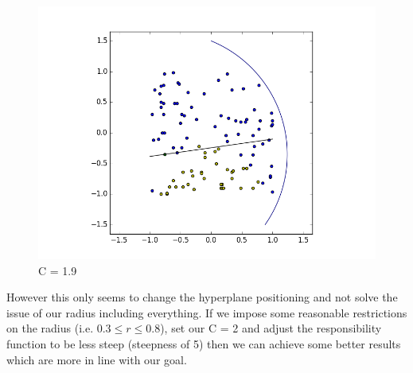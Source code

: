 \documentclass[notitlepage]{report}
\theoremstyle{definition}
\begin{document}
\begin{figure}[H]
\begin{minipage}[b]{0.49\textwidth}
    \includegraphics[width=\textwidth]{BoundaryHunter-Attempt3-04.png}
    \caption{C = 1.9}
  \end{minipage}
\end{figure}

However this only seems to change the hyperplane positioning and not solve the issue of our radius including everything. If we impose some reasonable restrictions on the radius (i.e. $0.3 \leq r \leq 0.8$), set our C = 2 and adjust the responsibility function to be less steep (steepness of 5) then we can achieve some better results which are more in line with our goal.
\end{document}
